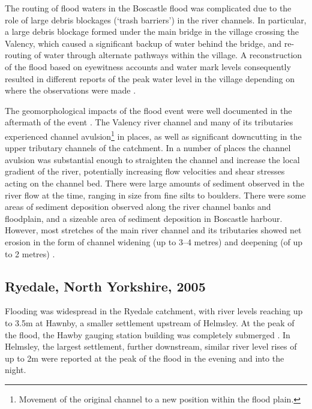 The routing of flood waters in the Boscastle flood was complicated due to the role of large debris blockages (`trash barriers') in the river channels. In particular, a large debris blockage formed under the main bridge in the village crossing the Valency, which caused a significant backup of water behind the bridge, and re-routing of water through alternate pathways within the village. A reconstruction of the flood based on eyewitness accounts and water mark levels consequently resulted in different reports of the peak water level in the village depending on where the observations were made \citep{wallingford2005flooding}. 

The geomorphological impacts of the flood event were well documented in the aftermath of the event \citep{wallingford2005flooding}. The Valency river channel and many of its tributaries experienced channel avulsion\footnote{Movement of the original channel to a new position within the flood plain.} in places, as well as significant downcutting in the upper tributary channels of the catchment. In a number of places the channel avulsion was substantial enough to straighten the channel and increase the local gradient of the river, potentially increasing flow velocities and shear stresses acting on the channel bed. There were large amounts of sediment observed in the river flow at the time, ranging in size from fine silts to boulders. There were some areas of sediment deposition observed along the river channel banks and floodplain, and a sizeable area of sediment deposition in Boscastle harbour. However, most stretches of the main river channel and its tributaries showed net erosion in the form of channel widening (up to 3--4 metres) and deepening (of up to 2 metres) \citep{wallingford2005flooding}.

\subsection{Ryedale, North Yorkshire, 2005}
Flooding was widespread in the Ryedale catchment, with river levels reaching up to 3.5m at Hawnby, a smaller settlement upstream of Helmsley. At the peak of the flood, the Hawby gauging station building was completely submerged  \citep{wass2008investigation}. In Helmsley, the largest settlement, further downstream, similar river level rises of up to 2m were reported at the peak of the flood in the evening and into the night. 

